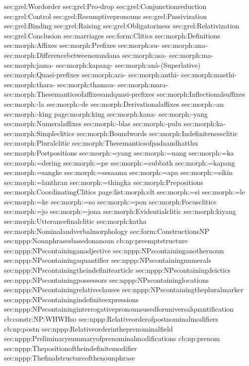 {sec:grel:Wordorder}
{sec:grel:Pro-drop}
{sec:grel:Conjunctionreduction}
{sec:grel:Control}
{sec:grel:Resumptivepronouns}
{sec:grel:Passivization}
{sec:grel:Binding}
{sec:grel:Raising}
{sec:grel:Obligatoriness}
{sec:grel:Relativization}
{sec:grel:Conclusion}
{sec:marriages}
{sec:form:Clitics}
{sec:morph:Definitions}
{sec:morph:Affixes}
{sec:morph:Prefixes}
{sec:morph:su-}
{sec:morph:ana-}
{sec:morph:Differencebetweensuandana}
{sec:morph:asa-}
{sec:morph:ma-}
{sec:morph:jama-}
{sec:morph:kapang-}
{sec:morph:anà-(Superlative)}
{sec:morph:Quasi-prefixes}
{sec:morph:ara-}
{sec:morph:anthi-}
{sec:morph:masthi-}
{sec:morph:thara-}
{sec:morph:thamau-}
{sec:morph:mara-}
{sec:morph:Thesemanticsofaffixesandquasi-prefixes}
{sec:morph:Inflectionalsuffixes}
{sec:morph:-la}
{sec:morph:-de}
{sec:morph:Derivationalaffixes}
{sec:morph:-an}
{sec:morph:-king}
{page:morph:king}
{sec:morph:kana-}
{sec:morph:-yang}
{sec:morph:Numeralaffixes}
{sec:morph:-blas}
{sec:morph:-pulu}
{sec:morph:ka-}
{sec:morph:Simpleclitics}
{sec:morph:Boundwords}
{sec:morph:Indefinitenessclitic}
{sec:morph:Pluralclitic}
{sec:morph:Thesemanticsofpadaandhatthu}
{sec:morph:Postpositions}
{sec:morph:=yang}
{sec:morph:=nang}
{sec:morph:=ka}
{sec:morph:=dering}
{sec:morph:=pe}
{sec:morph:=subbath}
{sec:morph:=kapang}
{sec:morph:=sangke}
{sec:morph:=sesaama}
{sec:morph:=apa}
{sec:morph:=sikin}
{sec:morph:=lanthran}
{sec:morph:=thingka}
{sec:morph:Prepositions}
{sec:morph:CoordinatingClitics}
{page:list:morph:clt}
{sec:morph:=si}
{sec:morph:=le}
{sec:morph:=ke}
{sec:morph:=so}
{sec:morph:=pon}
{sec:morph:Focusclitics}
{sec:morph:=jo}
{sec:morph:=jona}
{sec:morph:Evidentialclitic}
{sec:morph:kiyang}
{sec:morph:Utterancefinalclitic}
{sec:morph:katha}
{sec:morph:Nominalandverbalmorphology}
{sec:form:ConstructionsNP}
{sec:nppp:Nounphrasesbasedonanoun}
{cb:np:preemptstructure}
{sec:nppp:NPscontaininganadjective}
{sec:nppp:NPscontaininganothernoun}
{sec:nppp:NPscontainingaquantifier}
{sec:nppp:NPscontainingnumerals}
{sec:nppp:NPscontainingtheindefinitearticle}
{sec:nppp:NPscontainingdeictics}
{sec:nppp:NPscontainingpossessors}
{sec:nppp:NPscontaininglocations}
{sec:nppp:NPscontainingrelativeclauses}
{sec:nppp:NPscontainingthepluralmarker}
{sec:nppp:NPscontainingindefiniteexpressions}
{sec:nppp:NPscontaininginterrogativepronounsusedforuniversalquantification}
{cb:constr:NP:WHWHso}
{sec:nppp:Relativeorderofpostnominalmodifiers}
{cb:np:postn}
{sec:nppp:Relativeorderintheprenominalfield}
{sec:nppp:Preliminarysummaryofprenominalmodifications}
{cb:np:prenom}
{sec:nppp:Thepositionoftheindefinitemodifier}
{sec:nppp:Thefinalstructureofthenounphrase}
